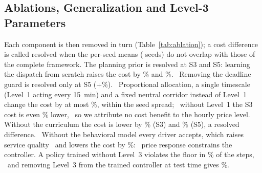 \subsection{Ablations, Generalization and Level-3 Parameters}
\label{sec:res-abl}
Each component is then removed in turn (Table~\ref{tab:ablation}); a cost difference
is called resolved when the per-seed means (\GAuxSeedsWord{} seeds) do not
overlap with those of the complete framework. The planning
prior is resolved at S3 and S5: learning the dispatch from scratch raises the
cost by \GAblDeltaCostAbsAblNoPriorSThree\% and
\GAblDeltaCostAbsAblNoPriorSFive\%.%
\ Removing the deadline guard is resolved only at S5
(+\GAblDeltaCostAbsAblNoGuardSFive\%).%
\ Proportional allocation, a single timescale (Level~1 acting every
\SI{15}{min}) and a fixed neutral corridor instead of Level~1 change the cost
by at most \GAblOverlapDeltaMax\%, within the seed spread;%
\ without Level~1 the S3 cost is even \GAblDeltaCostAbsAblNoLOneSThree\%
lower,%
\ so we attribute no cost benefit to the hourly price level. Without the
curriculum the cost is lower by \GAblDeltaCostAbsAblNoCurriculumSThree\% (S3)
and \GAblDeltaCostAbsAblNoCurriculumSFive\% (S5), a resolved
difference.%
\ Without the behavioral model every driver accepts, which raises service
quality%
\ and lowers the cost by \GAblDeltaCostAbsAblNoBehaviorSThree\%:%
\ price response constrains the controller. A policy trained without Level~3
violates the floor in
\GAblNoLThreeNestedNoLThreeSThreeResidentialIeeeThreeThreeTestViol\% of the
steps,%
\ and removing Level~3 from the trained controller at test time gives
\GAblationNestedNoLThreeSThreeResidentialIeeeThreeThreeTestViol\%.%


